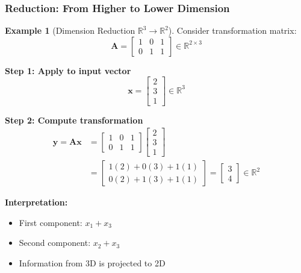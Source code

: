 \documentclass[12pt,a4paper]{article}
\theoremstyle{definition}
\newtheorem{example}{Example}[section]
\begin{document}
\subsubsection{Reduction: From Higher to Lower Dimension}

\begin{example}[Dimension Reduction $\mathbb{R}^3 \to \mathbb{R}^2$]
Consider transformation matrix:
\begin{equation}
\mathbf{A} = \begin{bmatrix}
1 & 0 & 1 \\
0 & 1 & 1
\end{bmatrix} \in \mathbb{R}^{2 \times 3}
\end{equation}

\textbf{Step 1: Apply to input vector}
\begin{equation}
\mathbf{x} = \begin{bmatrix} 2 \\ 3 \\ 1 \end{bmatrix} \in \mathbb{R}^3
\end{equation}

\textbf{Step 2: Compute transformation}
\begin{align}
\mathbf{y} = \mathbf{A}\mathbf{x} &= \begin{bmatrix}
1 & 0 & 1 \\
0 & 1 & 1
\end{bmatrix} \begin{bmatrix} 2 \\ 3 \\ 1 \end{bmatrix} \\
&= \begin{bmatrix}
1(2) + 0(3) + 1(1) \\
0(2) + 1(3) + 1(1)
\end{bmatrix} = \begin{bmatrix} 3 \\ 4 \end{bmatrix} \in \mathbb{R}^2
\end{align}

\textbf{Interpretation:}
\begin{itemize}
    \item First component: $x_1 + x_3$
    \item Second component: $x_2 + x_3$
    \item Information from 3D is projected to 2D
\end{itemize}


\end{example}
\end{document}
